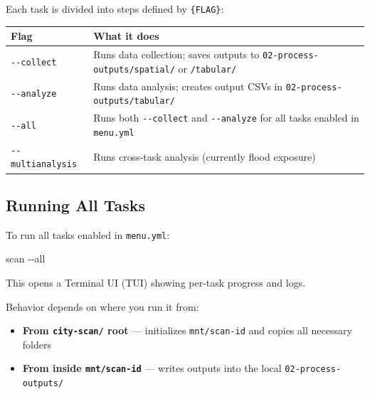 \documentclass[
  letterpaper,
  DIV=11,
  numbers=noendperiod]{scrreprt}
\newenvironment{Shaded}{\begin{snugshade}}{\end{snugshade}}
\newcommand{\AttributeTok}[1]{\textcolor[rgb]{0.40,0.45,0.13}{#1}}
\newcommand{\ExtensionTok}[1]{\textcolor[rgb]{0.00,0.23,0.31}{#1}}
\newcounter{none} %
\providecommand{\tightlist}{%
  \setlength{\itemsep}{0pt}\setlength{\parskip}{0pt}}
\begin{document}
Each task is divided into steps defined by \texttt{\{FLAG\}}:

{\def\LTcaptype{none} %
\begin{longtable}[]{@{}
  >{\raggedright\arraybackslash}p{}
  >{\raggedright\arraybackslash}p{}@{}}
\toprule\noalign{}
\begin{minipage}[b]{\linewidth}\raggedright
Flag
\end{minipage} & \begin{minipage}[b]{\linewidth}\raggedright
What it does
\end{minipage} \\
\midrule\noalign{}
\endhead
\bottomrule\noalign{}
\endlastfoot
\texttt{-\/-collect} & Runs data collection; saves outputs to
\texttt{02-process-outputs/spatial/} or \texttt{/tabular/} \\
\texttt{-\/-analyze} & Runs data analysis; creates output CSVs in
\texttt{02-process-outputs/tabular/} \\
\texttt{-\/-all} & Runs both \texttt{-\/-collect} and
\texttt{-\/-analyze} for all tasks enabled in \texttt{menu.yml} \\
\texttt{-\/-multianalysis} & Runs cross-task analysis (currently flood
exposure) \\
\end{longtable}
}

\subsection{Running All Tasks}\label{running-all-tasks}

To run all tasks enabled in \texttt{menu.yml}:

\begin{Shaded}
\begin{Highlighting}[]
\ExtensionTok{scan} \AttributeTok{{-}{-}all}
\end{Highlighting}
\end{Shaded}

This opens a Terminal UI (TUI) showing per-task progress and logs.

Behavior depends on where you run it from:

\begin{itemize}
\tightlist
\item
  \textbf{From \texttt{city-scan/} root} --- initializes
  \texttt{mnt/scan-id} and copies all necessary folders
\item
  \textbf{From inside \texttt{mnt/scan-id}} --- writes outputs into the
  local \texttt{02-process-outputs/}
\end{itemize}
\end{document}
